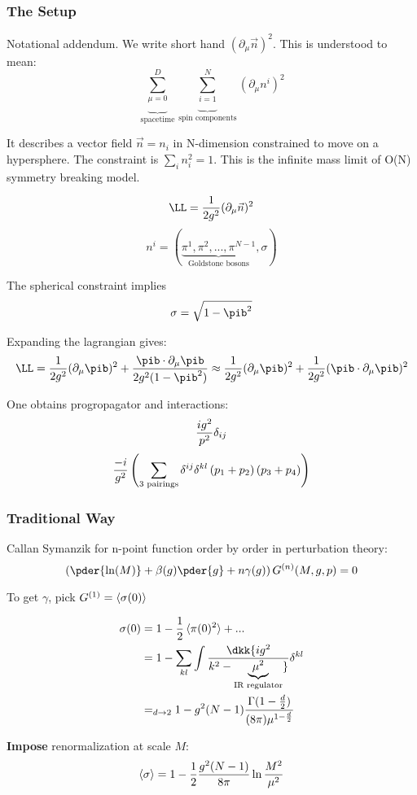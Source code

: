 \documentclass[11pt]{scrartcl}
\begin{document}
\subsubsection{The Setup}
\begin{example}
	Notational addendum.  We write short hand 
	$(\partial_{\mu} \vec{n})^2$.  This is understood to mean:
	\[\underbrace{\sum_{\mu = 0}^{D}}_{\text{spacetime}} \underbrace{\sum_{i = 1}^{N}}_{\text{spin components}} (\partial_{\mu} n^i)^2 \]
	\end{example}
It describes a vector field $\vec{n} = n_i$ in N-dimension constrained to move on a hypersphere.
The constraint is $\sum_{i} n_i^2 = 1$.  This is the infinite mass limit of O(N) symmetry breaking model.

\[ \LL = {1 \over 2 g^2} (\partial_\mu \vec{n})^2\]
\[n^i = ( \underbrace{\pi^1, \pi^2, ..., \pi^{N-1}}_{\text{Goldstone bosons}}, \sigma)\]

The spherical constraint implies
\[\sigma = \sqrt{1 - \pib^2}\]

Expanding the lagrangian gives:
\[\LL = {1 \over 2 g^2} (\partial_\mu \pib)^2 +  {\pib \cdot \partial_\mu \pib \over 2 g^2 (1 - \pib^2)} \approx {1 \over 2 g^2} (\partial_\mu \pib)^2  + {1 \over 2 g^2} (\pib \cdot \partial_\mu \pib)^2  \]

One obtains progropagator and interactions:
\[ {ig^2 \over p^2} \delta_{ij} \]
\[ {-i \over g^2} \left( \sum_{\text{3 pairings}} \delta^{ij} \delta^{kl} \left(p_{1} + p_{2} \right) \left(p_3+ p_4 \right) \right) \]
\subsubsection{Traditional Way}

Callan Symanzik for n-point function order by order in perturbation theory:
\[\left(\pder{\ln(M)} + \beta(g) \pder{g} + n \gamma(g) \right) G^{(n)} (M, g, p)  = 0 \]

To get $\gamma$, pick $G^{(1)} = \braket{\sigma(0)}$

\begin{align}
\sigma(0)  &= 1 - \frac12 \braket{\pi(0)^2}  + ... \\
&= 1 -\sum_{kl}  \int \dkk {ig^2 \over k^2 - \underbrace{\mu^2}_{\text{IR regulator}}} \delta^{kl} \\
&=_{d \rightarrow 2} 1 - {g^2} (N-1){\Gamma(1 - {d \over 2} ) \over (8 \pi) \mu^{1 - {d \over 2}}}
\end{align}

\textbf{Impose} renormalization at scale $M$:
\begin{align}
	\braket{\sigma} = 1 - \frac12 {g^2 (N-1) \over 8 \pi} \ln{M^2 \over \mu^2} 
	\end{align}
\end{document}
